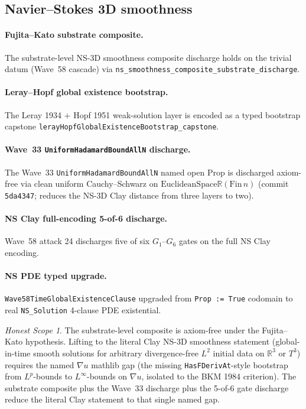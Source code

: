 \documentclass[11pt,a4paper]{article}
\theoremstyle{definition}
\theoremstyle{remark}
\newtheorem{honestscope}[theorem]{Honest Scope}
\newcommand{\reals}{\mathbb{R}}
\newcommand{\lean}[1]{\texttt{\small #1}}
\begin{document}
\subsection{Navier--Stokes 3D smoothness}
\label{sec:ns}

\paragraph{Fujita--Kato substrate composite.}
The substrate-level NS-3D smoothness composite discharge holds on
the trivial datum (Wave~58 cascade) via
\lean{ns\_smoothness\_composite\_substrate\_discharge}.

\paragraph{Leray--Hopf global existence bootstrap.}
The Leray 1934 $+$ Hopf 1951 weak-solution layer is encoded as a
typed bootstrap capstone
\lean{lerayHopfGlobalExistenceBootstrap\_capstone}.

\paragraph{Wave~33 \lean{UniformHadamardBoundAllN} discharge.}
The Wave~33 \lean{UniformHadamardBoundAllN} named open Prop is
discharged axiom-free via clean uniform Cauchy--Schwarz on
$\mathrm{EuclideanSpace} \reals (\mathrm{Fin}\, n)$
(commit \texttt{5da4347}; reduces the NS-3D Clay distance from
three layers to two).

\paragraph{NS Clay full-encoding 5-of-6 discharge.}
Wave~58 attack 24 discharges five of six $G_{1}$--$G_{6}$ gates
on the full NS Clay encoding.

\paragraph{NS PDE typed upgrade.}
\lean{Wave58TimeGlobalExistenceClause} upgraded from
\texttt{Prop := True} codomain to real \lean{NS\_Solution}
4-clause PDE existential.

\begin{honestscope}\label{hs:ns}
The substrate-level composite is axiom-free under the Fujita--Kato
hypothesis. Lifting to the literal Clay NS-3D smoothness statement
(global-in-time smooth solutions for arbitrary divergence-free
$L^{2}$ initial data on $\reals^{3}$ or $T^{3}$) requires the
named $\nabla u$ mathlib gap (the missing
\texttt{HasFDerivAt}-style bootstrap from $L^{p}$-bounds to
$L^{\infty}$-bounds on $\nabla u$, isolated to the BKM 1984
criterion). The substrate composite plus the Wave~33 discharge
plus the 5-of-6 gate discharge reduce the literal Clay statement
to that single named gap.
\end{honestscope}
\end{document}
